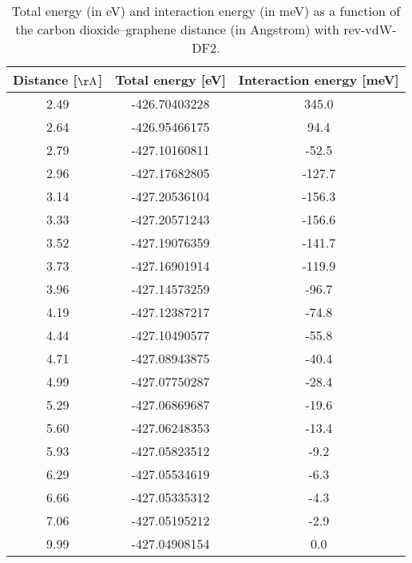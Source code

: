 \begin{table}[h]
\centering
\begin{tabular}{ccc}
\hline
Distance [$\mathrm{\AA}$] & Total energy [eV] & Interaction energy [meV] \\
\hline
2.49 & -426.70403228 & 345.0 \\
2.64 & -426.95466175 & 94.4 \\
2.79 & -427.10160811 & -52.5 \\
2.96 & -427.17682805 & -127.7 \\
3.14 & -427.20536104 & -156.3 \\
3.33 & -427.20571243 & -156.6 \\
3.52 & -427.19076359 & -141.7 \\
3.73 & -427.16901914 & -119.9 \\
3.96 & -427.14573259 & -96.7 \\
4.19 & -427.12387217 & -74.8 \\
4.44 & -427.10490577 & -55.8 \\
4.71 & -427.08943875 & -40.4 \\
4.99 & -427.07750287 & -28.4 \\
5.29 & -427.06869687 & -19.6 \\
5.60 & -427.06248353 & -13.4 \\
5.93 & -427.05823512 & -9.2 \\
6.29 & -427.05534619 & -6.3 \\
6.66 & -427.05335312 & -4.3 \\
7.06 & -427.05195212 & -2.9 \\
9.99 & -427.04908154 & 0.0 \\
\hline
\end{tabular}
\caption{Total energy (in eV) and interaction energy (in meV) as a function of the carbon dioxide--graphene distance (in Angstrom) with rev-vdW-DF2.}
\label{SI_dft_table_rev-vdW-DF2}
\end{table}